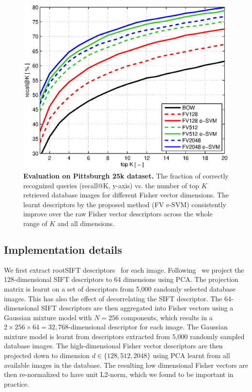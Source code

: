 \documentclass[10pt,twocolumn,letterpaper]{article}
\begin{document}
      \begin{figure}[t!]
         \centering
         \includegraphics[width=\linewidth]{imgs/plotPitt25k}    
         \caption{
            \textbf{Evaluation on Pittsburgh 25k \cite{Gronat13} dataset.} The fraction of correctly recognized queries (recall@K, y-axis) vs. the number of top $K$ retrieved database images for different Fisher vector dimensions. The learnt descriptors by the proposed method (FV e-SVM) consistently improve over the raw Fisher vector descriptors across the whole range of $K$  and all dimensions.
         }
         \label{fig:recall}
      \end{figure}

   \subsection{Implementation details}
      We first extract rootSIFT descriptors~\cite{Arandjelovic12} for each image. Following~\cite{Jegou12} we project the 128-dimensional SIFT descriptors to 64 dimensions using PCA. The projection matrix is learnt on a set of descriptors from 5,000 randomly selected database images. This has also the effect of decorrelating the SIFT descriptor. 
      The 64-dimensional SIFT descriptors are then aggregated into Fisher vectors using a Gaussian mixture model with $N=256$ components, which  results in a $2\times256\times64 = 32,768$-dimensional descriptor for each image. The Gaussian mixture model is learnt from descriptors extracted from 5,000 randomly sampled database images. 
      The  high-dimensional Fisher vector descriptors are then projected down to dimension $d\in\{128,512, 2048\}$ using PCA learnt from all available images in the database. 
      The resulting low dimensional Fisher vectors are then re-normalized to have unit L2-norm, which we found to be important in practice. 
\end{document}
